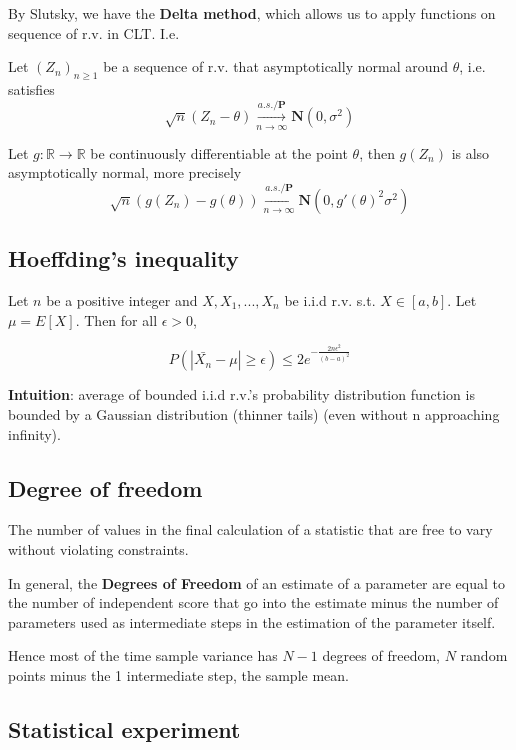 \documentclass{article}
\begin{document}
By Slutsky, we have the \textbf{Delta method}, which allows us to apply functions on sequence of r.v. in CLT. I.e.

Let $(Z_n)_{n \geq 1}$ be a sequence of r.v. that asymptotically normal around $\theta$, i.e. satisfies
$$
\sqrt{n} (Z_n - \theta) \overset{a.s./\mathbf{P}}{\underset{n \rightarrow \infty}{\longrightarrow}} \mathbf{N}(0, \sigma^2)
$$

Let $g: \mathbb{R} \rightarrow \mathbb{R}$ be continuously differentiable at the point $\theta$, then $g(Z_n)$ is also asymptotically normal, more precisely
$$
\sqrt{n} (g(Z_n) - g(\theta)) \overset{a.s./\mathbf{P}}{\underset{n \rightarrow \infty}{\longrightarrow}} \mathbf{N}(0, g'(\theta)^2 \sigma^2)
$$

\subsection{Hoeffding's inequality}

Let $n$ be a positive integer and $X, X_1, ..., X_n$ be i.i.d r.v. s.t. $X \in [a, b]$. Let $\mu = E[X]$. Then for all $\epsilon > 0$,

$$
P(|\bar{X_n} - \mu| \geq \epsilon) \leq 2 e^{-\frac{2 n \epsilon^2}{(b - a)^2}}
$$

\textbf{Intuition}: average of bounded i.i.d r.v.'s probability distribution function is bounded by a Gaussian distribution (thinner tails) (even without n approaching infinity).

\subsection{Degree of freedom}

The number of values in the final calculation of a statistic that are free to vary without violating constraints.

In general, the \textbf{Degrees of Freedom} of an estimate of a parameter are equal to the number of independent score that go into the estimate minus the number of parameters used as intermediate steps in the estimation of the parameter itself.

Hence most of the time sample variance has $N - 1$ degrees of freedom, $N$ random points minus the 1 intermediate step, the sample mean.

\subsection{Statistical experiment}
\end{document}
